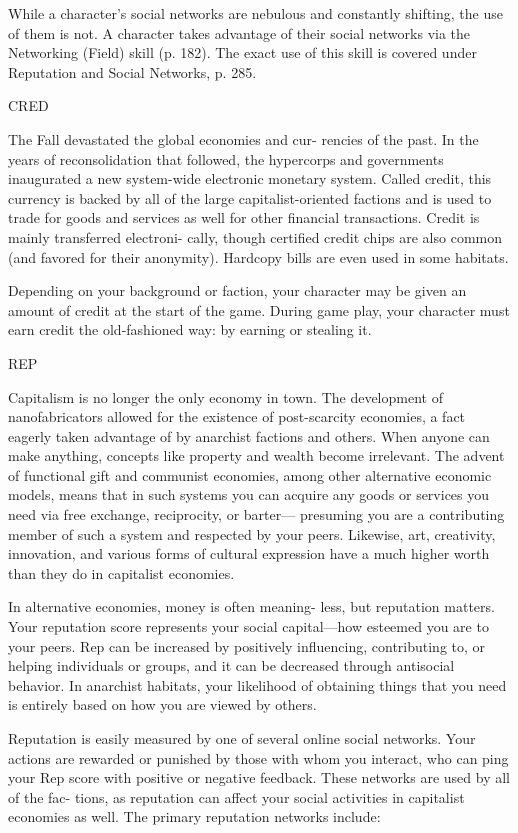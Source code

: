 While a character's social networks are nebulous
and constantly shifting, the use of them is not. A
character takes advantage of their social networks via
the Networking (Field) skill (p. 182). The exact use
of this skill is covered under Reputation and Social
Networks, p. 285.

CRED

The Fall devastated the global economies and cur-
rencies of the past. In the years of reconsolidation
that followed, the hypercorps and governments
inaugurated a new system-wide electronic monetary
system. Called credit, this currency is backed by all
of the large capitalist-oriented factions and is used to
trade for goods and services as well for other financial
transactions. Credit is mainly transferred electroni-
cally, though certified credit chips are also common
(and favored for their anonymity). Hardcopy bills are
even used in some habitats.

Depending on your background or faction, your
character may be given an amount of credit at the
start of the game. During game play, your character
must earn credit the old-fashioned way: by earning
or stealing it.

REP

Capitalism is no longer the only economy in town.
The development of nanofabricators allowed for the
existence of post-scarcity economies, a fact eagerly
taken advantage of by anarchist factions and others.
When anyone can make anything, concepts like
property and wealth become irrelevant. The advent
of functional gift and communist economies, among
other alternative economic models, means that in
such systems you can acquire any goods or services
you need via free exchange, reciprocity, or barter—
presuming you are a contributing member of such
a system and respected by your peers. Likewise, art,
creativity, innovation, and various forms of cultural
expression have a much higher worth than they do in
capitalist economies.

In alternative economies, money is often meaning-
less, but reputation matters. Your reputation score
represents your social capital—how esteemed you
are to your peers. Rep can be increased by positively
influencing, contributing to, or helping individuals or
groups, and it can be decreased through antisocial
behavior. In anarchist habitats, your likelihood of
obtaining things that you need is entirely based on
how you are viewed by others.

Reputation is easily measured by one of several
online social networks. Your actions are rewarded
or punished by those with whom you interact, who
can ping your Rep score with positive or negative
feedback. These networks are used by all of the fac-
tions, as reputation can affect your social activities in
capitalist economies as well. The primary reputation
networks include:

